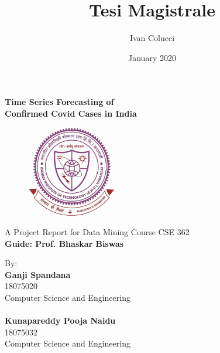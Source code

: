 \documentclass[a4paper, 12pt, oneside]{book}
\title{Tesi Magistrale}
\author{Ivan Colucci}
\date{January 2020}
\begin{document}
\begin{titlepage}
    \begin{center}
        \LARGE{\textbf{Time Series Forecasting of \\ Confirmed Covid Cases in India}}\\

    \end{center}
    \begin{figure}[H]
        \centering
        \includegraphics[width=0.35\textwidth]{IITBHU-Logo.jpg}
    \end{figure}
    
    \begin{center}
    	\normalsize{A Project Report for Data Mining Course \linebreak CSE 362 }\\
    	\vspace{5mm}
        {\large{\bf Guide: Prof. Bhaskar Biswas}}\\
    	\vspace{3mm}
    \end{center}
    
    \vspace{5mm}
    \noindent
    \begin{minipage}[t]{0.47\textwidth}
    	{\large{ By:\\ \textbf{Ganji Spandana} \\18075020\\Computer Science and Engineering}}
    	\vspace{1mm}\\
    	{\large{\\ \textbf{Kunapareddy Pooja Naidu} \\18075032\\Computer Science and Engineering}}
    	\vspace{6mm}\\
    	

\end{minipage}
\end{titlepage}
\end{document}
